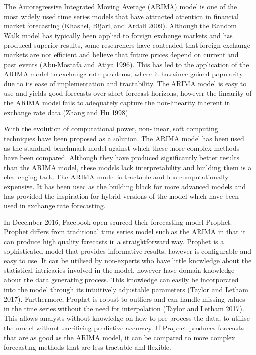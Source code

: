 \documentclass[12pt,a4paper]{article}
\numberwithin{equation}{section}
\numberwithin{figure}{section}
\numberwithin{table}{section}
\begin{document}
The Autoregressive Integrated Moving Average (ARIMA) model is one of the
most widely used time series models that have attracted attention in
financial market forecasting (Khashei, Bijari, and Ardali 2009).
Although the Random Walk model has typically been applied to foreign
exchange markets and has produced superior results, some researchers
have contended that foreign exchange markets are not efficient and
believe that future prices depend on current and past events
(Abu-Mostafa and Atiya 1996). This has led to the application of the
ARIMA model to exchange rate problems, where it has since gained
popularity due to its ease of implementation and tractability. The ARIMA
model is easy to use and yields good forecasts over short forecast
horizons, however the linearity of the ARIMA model fails to adequately
capture the non-linearity inherent in exchange rate data (Zhang and Hu
1998).

With the evolution of computational power, non-linear, soft computing
techniques have been proposed as a solution. The ARIMA model has been
used as the standard benchmark model against which these more complex
methods have been compared. Although they have produced significantly
better results than the ARIMA model, these models lack interpretability
and building them is a challenging task. The ARIMA model is tractable
and less computationally expensive. It has been used as the building
block for more advanced models and has provided the inspiration for
hybrid versions of the model which have been used in exchange rate
forecasting.

In December 2016, Facebook open-sourced their forecasting model Prophet.
Prophet differs from traditional time series model such as the ARIMA in
that it can produce high quality forecasts in a straightforward way.
Prophet is a sophisticated model that provides informative results,
however is configurable and easy to use. It can be utilised by
non-experts who have little knowledge about the statistical intricacies
involved in the model, however have domain knowledge about the data
generating process. This knowledge can easily be incorporated into the
model through its intuitively adjustable parameters (Taylor and Letham
2017). Furthermore, Prophet is robust to outliers and can handle missing
values in the time series without the need for interpolation (Taylor and
Letham 2017). This allows analysts without knowledge on how to
pre-process the data, to utilise the model without sacrificing
predictive accuracy. If Prophet produces forecasts that are as good as
the ARIMA model, it can be compared to more complex forecasting methods
that are less tractable and flexible.
\end{document}
